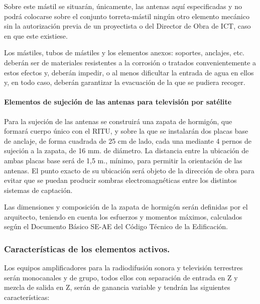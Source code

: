 Sobre este mástil se situarán, únicamente, las antenas aquí especificadas y no podrá colocarse sobre el conjunto torreta-mástil ningún otro elemento mecánico sin la autorización previa de un proyectista o del Director de Obra de ICT, caso en que este existiese.

Los mástiles, tubos de mástiles y los elementos anexos: soportes, anclajes, etc. deberán ser de materiales resistentes a la corrosión o tratados convenientemente a estos efectos y, deberán impedir, o al menos dificultar la entrada de agua en ellos y, en todo caso, deberán garantizar la evacuación de la que se pudiera recoger.

\paragraph{Elementos de sujeción de las antenas para televisión por satélite}

Para la sujeción de las antenas se construirá una zapata de hormigón, que formará cuerpo único con el RITU, y sobre la que se instalarán dos placas base de anclaje, de forma cuadrada de 25 cm de lado, cada una mediante 4 pernos de sujeción a la zapata, de 16 mm. de diámetro. La distancia entre la ubicación de ambas placas base será de 1,5 m., mínimo, para permitir la orientación de las antenas. El punto exacto de su ubicación será objeto de la dirección de obra para evitar que se puedan producir sombras electromagnéticas entre los distintos sistemas de captación.

Las dimensiones y composición de la zapata de hormigón serán definidas por el arquitecto, teniendo en cuenta los esfuerzos y momentos máximos, calculados según el Documento Básico SE-AE del Código Técnico de la Edificación.

\subsubsection{Características de los elementos activos.}

Los equipos amplificadores para la radiodifusión sonora y televisión terrestres serán monocanales y de grupo, todos ellos con separación de entrada en Z y mezcla de salida en Z, serán de ganancia variable y tendrán las siguientes características:

